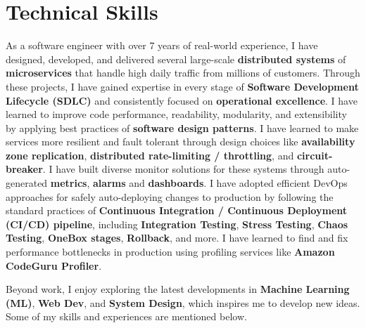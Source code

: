 %
\vspace{-10pt}
\section{Technical Skills}
\vspace{3pt}
As a software engineer with over 7 years of real-world experience, I have designed, developed, and delivered several large-scale \textbf{distributed systems} of \textbf{microservices} that handle high daily traffic from millions of customers. Through these projects, I have gained expertise in every stage of \textbf{Software Development Lifecycle (SDLC)} and consistently focused on \textbf{operational excellence}. I have learned to improve code performance, readability, modularity, and extensibility by applying best practices of \textbf{software design patterns}. I have learned to make services more resilient and fault tolerant through design choices like \textbf{availability zone replication}, \textbf{distributed rate-limiting / throttling}, and \textbf{circuit-breaker}. I have built diverse monitor solutions for these systems through auto-generated \textbf{metrics}, \textbf{alarms} and \textbf{dashboards}. I have adopted efficient DevOps approaches for safely auto-deploying changes to production by following the standard practices of \textbf{Continuous Integration / Continuous Deployment (CI/CD) pipeline}, including \textbf{Integration Testing}, \textbf{Stress Testing}, \textbf{Chaos Testing}, \textbf{OneBox stages}, \textbf{Rollback}, and more. I have learned to find and fix performance bottlenecks in production using profiling services like \textbf{Amazon CodeGuru Profiler}.
\par\vspace{5pt} 
Beyond work, I enjoy exploring the latest developments in \textbf{Machine Learning (ML)}, \textbf{Web Dev}, and \textbf{System Design}, which inspires me to develop new ideas. Some of my skills and experiences are mentioned below.

